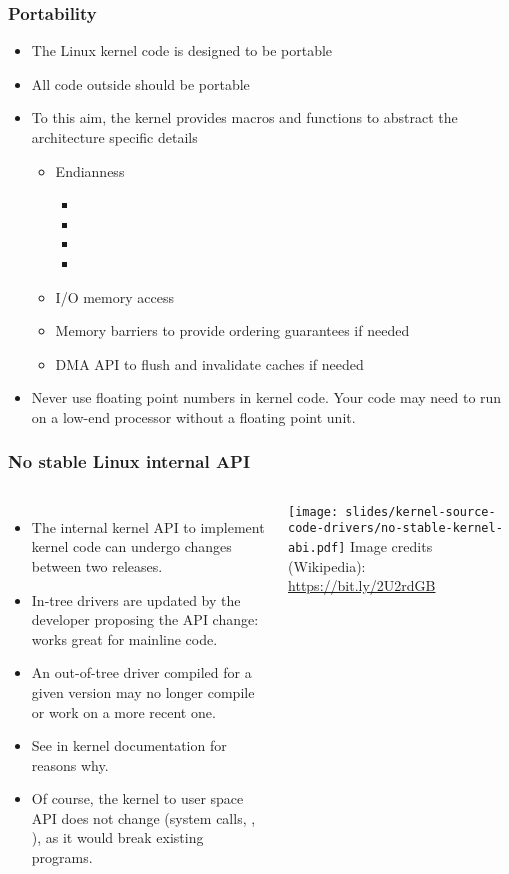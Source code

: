 \begin{frame}
  \frametitle{Portability}
  \begin{itemize}
  \item The Linux kernel code is designed to be portable
  \item All code outside  should be portable
  \item To this aim, the kernel provides macros and functions to
    abstract the architecture specific details
    \begin{itemize}
    \item Endianness
      \begin{itemize}
      \item {}
      \item {}
      \item {}
      \item {}
      \end{itemize}
    \item I/O memory access
    \item Memory barriers to provide ordering guarantees if needed
    \item DMA API to flush and invalidate caches if needed
    \end{itemize}
  \item Never use floating point numbers in kernel code. Your code may
    need to run on a low-end processor without a floating point unit.
  \end{itemize}
\end{frame}

\begin{frame}
  \frametitle{No stable Linux internal API}
  \begin{columns}
    \begin{itemize}
    \item The internal kernel API to implement kernel code can undergo
      changes between two releases.
    \item In-tree drivers are updated by the developer proposing the API
      change: works great for mainline code.
    \item An out-of-tree driver compiled for a given version may no
      longer compile or work on a more recent one.
    \item See  in kernel
      documentation for reasons why.
    \item Of course, the kernel to user space API does not change (system
      calls, , ), as it would break existing
      programs.
    \end{itemize}
    \texttt{[image: slides/kernel-source-code-drivers/no-stable-kernel-abi.pdf]}
    \tiny
    Image credits (Wikipedia):\\
    \url{https://bit.ly/2U2rdGB}
  \end{columns}
\end{frame}

